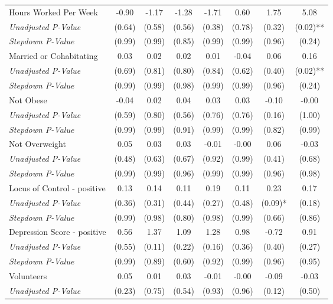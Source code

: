 \begin{tabular}{l c c c c c c c}
Hours Worked Per Week & -0.90 & -1.17 & -1.28 & -1.71 & 0.60 & 1.75 & 5.08 \\
\quad \textit{Unadjusted P-Value} & (0.64) & (0.58) & (0.56) & (0.38) & (0.78) & (0.32) & (0.02)** \\
\quad \textit{Stepdown P-Value} & (0.99) & (0.99) & (0.85) & (0.99) & (0.99) & (0.96) & (0.24) \\
Married or Cohabitating & 0.03 & 0.02 & 0.02 & 0.01 & -0.04 & 0.06 & 0.16 \\
\quad \textit{Unadjusted P-Value} & (0.69) & (0.81) & (0.80) & (0.84) & (0.62) & (0.40) & (0.02)** \\
\quad \textit{Stepdown P-Value} & (0.99) & (0.99) & (0.98) & (0.99) & (0.99) & (0.96) & (0.24) \\
Not Obese & -0.04 & 0.02 & 0.04 & 0.03 & 0.03 & -0.10 & -0.00 \\
\quad \textit{Unadjusted P-Value} & (0.59) & (0.80) & (0.56) & (0.76) & (0.76) & (0.16) & (1.00) \\
\quad \textit{Stepdown P-Value} & (0.99) & (0.99) & (0.91) & (0.99) & (0.99) & (0.82) & (0.99) \\
Not Overweight & 0.05 & 0.03 & 0.03 & -0.01 & -0.00 & 0.06 & -0.03 \\
\quad \textit{Unadjusted P-Value} & (0.48) & (0.63) & (0.67) & (0.92) & (0.99) & (0.41) & (0.68) \\
\quad \textit{Stepdown P-Value} & (0.99) & (0.99) & (0.96) & (0.99) & (0.99) & (0.96) & (0.98) \\
Locus of Control - positive & 0.13 & 0.14 & 0.11 & 0.19 & 0.11 & 0.23 & 0.17 \\
\quad \textit{Unadjusted P-Value} & (0.36) & (0.31) & (0.44) & (0.27) & (0.48) & (0.09)* & (0.18) \\
\quad \textit{Stepdown P-Value} & (0.99) & (0.98) & (0.80) & (0.98) & (0.99) & (0.66) & (0.86) \\
Depression Score - positive & 0.56 & 1.37 & 1.09 & 1.28 & 0.98 & -0.72 & 0.91 \\
\quad \textit{Unadjusted P-Value} & (0.55) & (0.11) & (0.22) & (0.16) & (0.36) & (0.40) & (0.27) \\
\quad \textit{Stepdown P-Value} & (0.99) & (0.89) & (0.60) & (0.92) & (0.99) & (0.96) & (0.95) \\
Volunteers & 0.05 & 0.01 & 0.03 & -0.01 & -0.00 & -0.09 & -0.03 \\
\quad \textit{Unadjusted P-Value} & (0.23) & (0.75) & (0.54) & (0.93) & (0.96) & (0.12) & (0.50) \\

\end{tabular}
